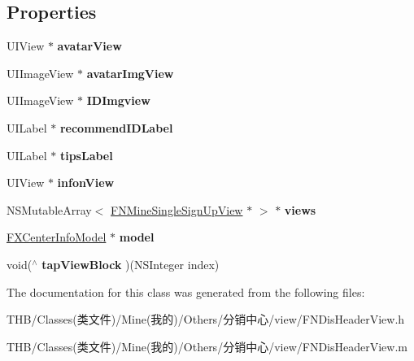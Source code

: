 \subsection*{Properties}
\begin{DoxyCompactItemize}
\item 
\mbox{\label{interface_f_n_dis_header_view_a1dcbe46b409b57851366434202bb2f3a}} 
U\+I\+View $\ast$ {\bfseries avatar\+View}
\item 
\mbox{\label{interface_f_n_dis_header_view_ac9dcb3f8a57e5ce63046f7b9e1393540}} 
U\+I\+Image\+View $\ast$ {\bfseries avatar\+Img\+View}
\item 
\mbox{\label{interface_f_n_dis_header_view_a40101862d7ececad51446d80036ebc1f}} 
U\+I\+Image\+View $\ast$ {\bfseries I\+D\+Imgview}
\item 
\mbox{\label{interface_f_n_dis_header_view_a059cdbd60282f9857a961c24c0dfa0e9}} 
U\+I\+Label $\ast$ {\bfseries recommend\+I\+D\+Label}
\item 
\mbox{\label{interface_f_n_dis_header_view_a1a2852bdb75cb1246d612e1060847065}} 
U\+I\+Label $\ast$ {\bfseries tips\+Label}
\item 
\mbox{\label{interface_f_n_dis_header_view_a6d080da7141c87ce4a67e00c4fdb9acf}} 
U\+I\+View $\ast$ {\bfseries infon\+View}
\item 
\mbox{\label{interface_f_n_dis_header_view_a869b69b8a6f8be0f23bc3e2c99e18ef0}} 
N\+S\+Mutable\+Array$<$ \mbox{\hyperlink{interface_f_n_mine_single_sign_up_view}{F\+N\+Mine\+Single\+Sign\+Up\+View}} $\ast$ $>$ $\ast$ {\bfseries views}
\item 
\mbox{\label{interface_f_n_dis_header_view_a95916a07de944763336d6fa5b7896879}} 
\mbox{\hyperlink{interface_f_x_center_info_model}{F\+X\+Center\+Info\+Model}} $\ast$ {\bfseries model}
\item 
\mbox{\label{interface_f_n_dis_header_view_a9e3c21bcf7da214fac5e9e15f1ccecd8}} 
void($^\wedge$ {\bfseries tap\+View\+Block} )(N\+S\+Integer index)
\end{DoxyCompactItemize}


The documentation for this class was generated from the following files\+:\begin{DoxyCompactItemize}
\item 
T\+H\+B/\+Classes(类文件)/\+Mine(我的)/\+Others/分销中心/view/F\+N\+Dis\+Header\+View.\+h\item 
T\+H\+B/\+Classes(类文件)/\+Mine(我的)/\+Others/分销中心/view/F\+N\+Dis\+Header\+View.\+m\end{DoxyCompactItemize}
